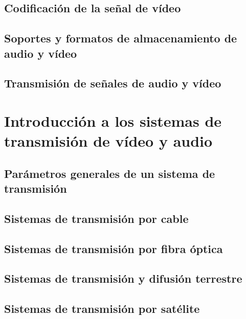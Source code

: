 \documentclass[10pt]{book}
\begin{document}
\section{Codificación de la señal de vídeo}

\section{Soportes y formatos de almacenamiento de audio y vídeo}

\section{Transmisión de señales de audio y vídeo}



\chapter{Introducción a los sistemas de transmisión de vídeo y audio}

\section{Parámetros generales de un sistema de transmisión}

\section{Sistemas de transmisión por cable}

\section{Sistemas de transmisión por fibra óptica}

\section{Sistemas de transmisión y difusión terrestre}

\section{Sistemas de transmisión por satélite}
\end{document}
